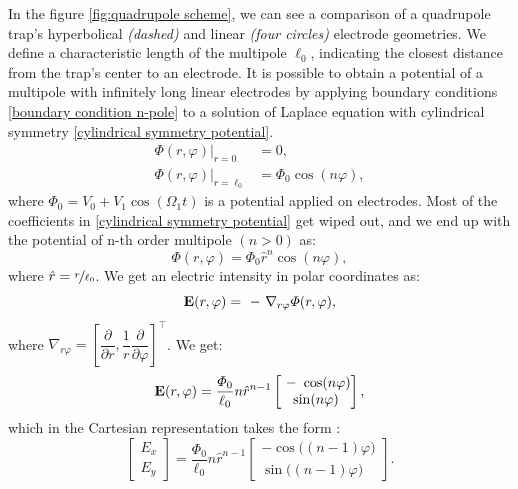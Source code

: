 In the figure \ref{fig:quadrupole scheme}, we can see a comparison of a quadrupole trap's hyperbolical \textit{(dashed)} and linear \textit{(four circles)} electrode geometries. We define a characteristic length of the multipole $\ell_0$, indicating the closest distance from the trap's center to an electrode. It is possible to obtain a potential of a multipole with infinitely long linear electrodes by applying boundary conditions \eqref{boundary condition n-pole} to a solution of Laplace equation with cylindrical symmetry \eqref{cylindrical symmetry potential}.
\begin{subequations}
\label{boundary condition n-pole}
\begin{align}
	\Phi(r,\varphi)\vert_{r=0}&=0, \\
	\Phi(r,\varphi)\vert_{r=\ell_0}&=\Phi_0 \cos(n\varphi),
\end{align}
\end{subequations}
where $\Phi_0 = V_0 + V_1 \cos(\Omega_1 t)$ is a potential applied on electrodes. Most of the coefficients in \eqref{cylindrical symmetry potential} get wiped out, and we end up with the potential of n-th order multipole $(n > 0)$ as:
\begin{equation}
	\label{potential n-pole}
	\Phi(r,\varphi) = \Phi_0 \hat{r}^n \cos(n\varphi),	
\end{equation}
where $\hat{r} = \nicefrac{r}{\ell_0}$. We get an electric intensity in polar coordinates as: 
\begin{equation}
	\vb{E}(r,\varphi) = \minus\nabla_{r\varphi} \Phi(r,\varphi),
\end{equation}
where $\nabla_{r\varphi} = \left[\dfrac{\partial}{\partial r}, \dfrac{1}{r} \dfrac{\partial}{\partial \varphi}\right]^\top$. We get:
\begin{equation}
\label{need this for norm(E_0)}
\vb{E}(r,\varphi) = \dfrac{\Phi_0}{\ell_0} n \hat{r}^{n-1} 
\begin{bmatrix}
	\minus\cos(n\varphi) \\
	\sin(n\varphi)
\end{bmatrix},
\end{equation}
which in the Cartesian representation takes the form \cite{gerlich1992inhomogeneous}:
\begin{equation}
\begin{bmatrix}
	E_x \\
	E_y
\end{bmatrix}
 = \dfrac{\Phi_0}{\ell_0} n \hat{r}^{n-1} 
\begin{bmatrix}
	\minus\cos\big((n \minus 1)\varphi\big) \\
	\sin\big((n \minus 1)\varphi\big)
\end{bmatrix}.
\end{equation}
